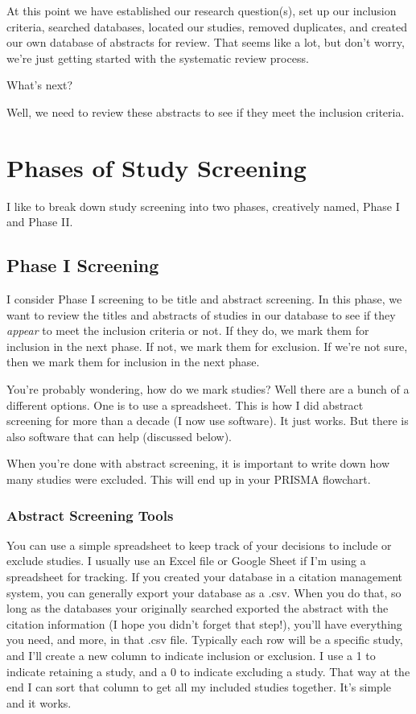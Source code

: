 \documentclass[
]{book}
\begin{document}
At this point we have established our research question(s), set up our inclusion criteria, searched databases, located our studies, removed duplicates, and created our own database of abstracts for review. That seems like a lot, but don't worry, we're just getting started with the systematic review process.

What's next?

Well, we need to review these abstracts to see if they meet the inclusion criteria.

\hypertarget{phases-of-study-screening}{%
\section{Phases of Study Screening}\label{phases-of-study-screening}}

I like to break down study screening into two phases, creatively named, Phase I and Phase II.

\hypertarget{phase-i-screening}{%
\subsection{Phase I Screening}\label{phase-i-screening}}

I consider Phase I screening to be title and abstract screening. In this phase, we want to review the titles and abstracts of studies in our database to see if they \emph{appear} to meet the inclusion criteria or not. If they do, we mark them for inclusion in the next phase. If not, we mark them for exclusion. If we're not sure, then we mark them for inclusion in the next phase.

You're probably wondering, how do we mark studies? Well there are a bunch of a different options. One is to use a spreadsheet. This is how I did abstract screening for more than a decade (I now use software). It just works. But there is also software that can help (discussed below).

When you're done with abstract screening, it is important to write down how many studies were excluded. This will end up in your PRISMA flowchart.

\hypertarget{abstract-screening-tools}{%
\subsubsection{Abstract Screening Tools}\label{abstract-screening-tools}}

You can use a simple spreadsheet to keep track of your decisions to include or exclude studies. I usually use an Excel file or Google Sheet if I'm using a spreadsheet for tracking. If you created your database in a citation management system, you can generally export your database as a .csv. When you do that, so long as the databases your originally searched exported the abstract with the citation information (I hope you didn't forget that step!), you'll have everything you need, and more, in that .csv file. Typically each row will be a specific study, and I'll create a new column to indicate inclusion or exclusion. I use a 1 to indicate retaining a study, and a 0 to indicate excluding a study. That way at the end I can sort that column to get all my included studies together. It's simple and it works.
\end{document}
